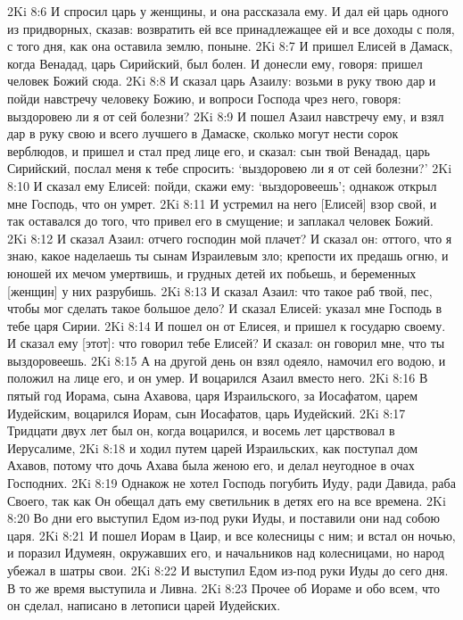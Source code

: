 2Ki 8:6  И спросил царь у женщины, и она рассказала ему. И дал ей царь одного из придворных, сказав: возвратить ей все принадлежащее ей и все доходы с поля, с того дня, как она оставила землю, поныне.
2Ki 8:7  И пришел Елисей в Дамаск, когда Венадад, царь Сирийский, был болен. И донесли ему, говоря: пришел человек Божий сюда.
2Ki 8:8  И сказал царь Азаилу: возьми в руку твою дар и пойди навстречу человеку Божию, и вопроси Господа чрез него, говоря: выздоровею ли я от сей болезни?
2Ki 8:9  И пошел Азаил навстречу ему, и взял дар в руку свою и всего лучшего в Дамаске, сколько могут нести сорок верблюдов, и пришел и стал пред лице его, и сказал: сын твой Венадад, царь Сирийский, послал меня к тебе спросить: `выздоровею ли я от сей болезни?'
2Ki 8:10  И сказал ему Елисей: пойди, скажи ему: `выздоровеешь'; однакож открыл мне Господь, что он умрет.
2Ki 8:11  И устремил на него [Елисей] взор свой, и так оставался до того, что привел его в смущение; и заплакал человек Божий.
2Ki 8:12  И сказал Азаил: отчего господин мой плачет? И сказал он: оттого, что я знаю, какое наделаешь ты сынам Израилевым зло; крепости их предашь огню, и юношей их мечом умертвишь, и грудных детей их побьешь, и беременных [женщин] у них разрубишь.
2Ki 8:13  И сказал Азаил: что такое раб твой, пес, чтобы мог сделать такое большое дело? И сказал Елисей: указал мне Господь в тебе царя Сирии.
2Ki 8:14  И пошел он от Елисея, и пришел к государю своему. И сказал ему [этот]: что говорил тебе Елисей? И сказал: он говорил мне, что ты выздоровеешь.
2Ki 8:15  А на другой день он взял одеяло, намочил его водою, и положил на лице его, и он умер. И воцарился Азаил вместо него.
2Ki 8:16  В пятый год Иорама, сына Ахавова, царя Израильского, за Иосафатом, царем Иудейским, воцарился Иорам, сын Иосафатов, царь Иудейский.
2Ki 8:17  Тридцати двух лет был он, когда воцарился, и восемь лет царствовал в Иерусалиме,
2Ki 8:18  и ходил путем царей Израильских, как поступал дом Ахавов, потому что дочь Ахава была женою его, и делал неугодное в очах Господних.
2Ki 8:19  Однакож не хотел Господь погубить Иуду, ради Давида, раба Своего, так как Он обещал дать ему светильник в детях его на все времена.
2Ki 8:20  Во дни его выступил Едом из-под руки Иуды, и поставили они над собою царя.
2Ki 8:21  И пошел Иорам в Цаир, и все колесницы с ним; и встал он ночью, и поразил Идумеян, окружавших его, и начальников над колесницами, но народ убежал в шатры свои.
2Ki 8:22  И выступил Едом из-под руки Иуды до сего дня. В то же время выступила и Ливна.
2Ki 8:23  Прочее об Иораме и обо всем, что он сделал, написано в летописи царей Иудейских.
